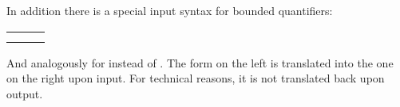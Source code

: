 \begin{isabellebody}
\begin{isamarkuptext}
In addition there is a special input syntax for bounded quantifiers:
\begin{center}
\begin{tabular}{lcl}
\isa{{\isasymforall}x\ {\isasymle}\ y{\isachardot}\ P\ x} & \isa{{\isasymrightharpoonup}} & \isa{{\isasymforall}x{\isachardot}\ x\ {\isasymle}\ y\ {\isasymlongrightarrow}\ P\ x} \\
\isa{{\isasymexists}x\ {\isasymle}\ y{\isachardot}\ P\ x} & \isa{{\isasymrightharpoonup}} & \isa{{\isasymexists}x{\isachardot}\ x\ {\isasymle}\ y\ {\isasymand}\ P\ x}
\end{tabular}
\end{center}
And analogously for \isa{{\isacharless}} instead of \isa{{\isasymle}}.
The form on the left is translated into the one on the right upon input.
For technical reasons, it is not translated back upon output.%
\end{isamarkuptext}%
\isamarkuptrue%
\isamarkupfalse%
\end{isabellebody}%
